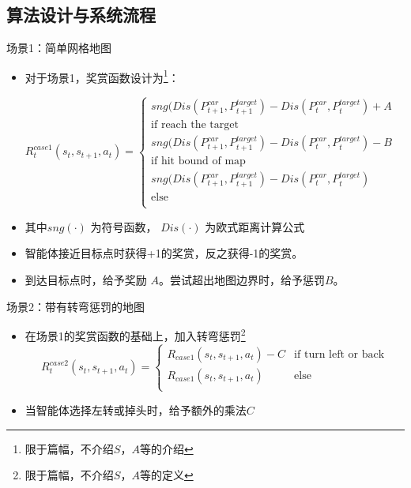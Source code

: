 \documentclass{beamer}
\begin{document}
\subsection{算法设计与系统流程}
\begin{frame}{场景1：简单网格地图}
\begin{itemize}
    \item 对于场景1，奖赏函数设计为\footnote{限于篇幅，不介绍$S$，$A$等的介绍}：
        \begin{center}
           \begin{equation}
            \label{rewardcase1}
            R_t^{case1}(s_t, s_{t+1}, a_t) = \begin{cases}
             sng(Dis(P_{t+1}^{car}, P_{t+1}^{target}) - Dis(P_{t}^{car}, P_{t}^{target}) + A &\\ \mbox{if reach the target}\\
             sng(Dis(P_{t+1}^{car}, P_{t+1}^{target}) - Dis(P_{t}^{car}, P_{t}^{target}) - B &\\ \mbox{if hit bound of map}\\
             sng(Dis(P_{t+1}^{car}, P_{t+1}^{target}) - Dis(P_{t}^{car}, P_{t}^{target}) &\\ \mbox{else}\\
             \end{cases}
            \end{equation} 
        \end{center}

        \item 其中$sng(\cdot)$ 为符号函数， $Dis(\cdot)$ 为欧式距离计算公式
    \item 智能体接近目标点时获得+1的奖赏，反之获得-1的奖赏。
    \item 到达目标点时，给予奖励 $A$。尝试超出地图边界时，给予惩罚$B$。
    
\end{itemize}
\end{frame}
\begin{frame}{场景2：带有转弯惩罚的地图}
    \begin{itemize}
        \item 在场景1的奖赏函数的基础上，加入转弯惩罚\footnote{限于篇幅，不介绍$S$，$A$等的定义}
        \begin{equation}
        \label{eq2reward}
            R_t^{case2}(s_t, s_{t+1}, a_t) = \begin{cases}
             R_{case1}(s_t, s_{t+1}, a_t) - C &\mbox{if turn left or back}\\
             R_{case1}(s_t, s_{t+1}, a_t) &\mbox{else}\\
             \end{cases}
    \end{equation}
    \item 当智能体选择左转或掉头时，给予额外的乘法$C$
    \end{itemize}
\end{frame}
\end{document}
